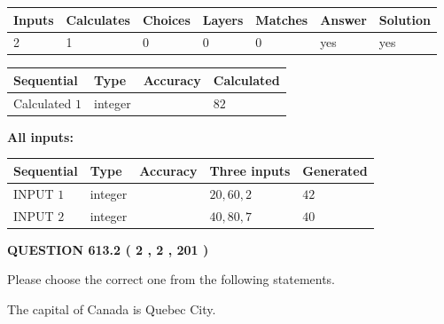 \documentclass[12pt]{article}
\begin{document}
 

 
   
   
   
   
\noindent\begin{tabular}{|l|l|l|l|l|l|l|}
 \hline
Inputs & Calculates & Choices & Layers & Matches & Answer & Solution \\ \hline
 2  & 
 1  & 
 0
  & 
 0  & 
 0  & 
  yes & 
  yes 
  \\ \hline
 \end{tabular}
   
   
   
   
\noindent{}
   
   
  
  
\noindent\begin{tabular}{|l|l|l|l|}
\hline
 Sequential & Type & Accuracy & Calculated \\ 
\hline
 
 
  Calculated $  1 $ & integer &  & 
  $ 82 $ 
 \\  \hline  
 \end{tabular}
   
   
   
   
\noindent\vspace{0.1in}\hspace{-0.08in} {\textbf{\Large{All inputs: }}}
   
   
  
  
\noindent\begin{tabular}{|l|l|l|l|l|}
\hline
 Sequential & Type & Accuracy & Three inputs & Generated \\ 
\hline
 
 
  INPUT $  1 $ & integer &  & $
 20
 , 
 60
 , 
 2
 $ & $ 42 $ 
 \\  \hline  
 
 
  INPUT $  2 $ & integer &  & $
 40
 , 
 80
 , 
 7
 $ & $ 40 $ 
 \\  \hline  
 \end{tabular}
   
   
  
\vspace{0.2in}
  
{\textbf{\Large{QUESTION
613.2 
 ( 2 , 2 , 201 )
}}}
  
  
Please choose the correct one from the following statements.
 
 
The capital of Canada is Quebec City.
 
\end{document}
